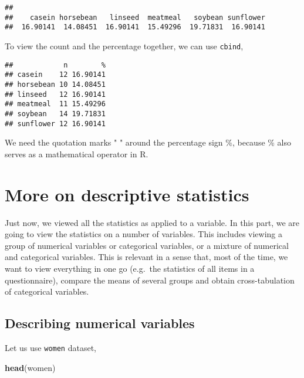 \documentclass[]{book}
\newenvironment{Shaded}{\begin{snugshade}}{\end{snugshade}}
\newcommand{\KeywordTok}[1]{\textcolor[rgb]{0.13,0.29,0.53}{\textbf{{#1}}}}
\newcommand{\DataTypeTok}[1]{\textcolor[rgb]{0.13,0.29,0.53}{{#1}}}
\newcommand{\DecValTok}[1]{\textcolor[rgb]{0.00,0.00,0.81}{{#1}}}
\newcommand{\StringTok}[1]{\textcolor[rgb]{0.31,0.60,0.02}{{#1}}}
\newcommand{\NormalTok}[1]{{#1}}
\theoremstyle{definition}
\theoremstyle{definition}
\theoremstyle{remark}
\begin{document}
\begin{verbatim}
## 
##    casein horsebean   linseed  meatmeal   soybean sunflower 
##  16.90141  14.08451  16.90141  15.49296  19.71831  16.90141
\end{verbatim}

To view the count and the percentage together, we can use
\texttt{cbind},

\begin{Shaded}
\end{Shaded}

\begin{verbatim}
##            n        %
## casein    12 16.90141
## horsebean 10 14.08451
## linseed   12 16.90141
## meatmeal  11 15.49296
## soybean   14 19.71831
## sunflower 12 16.90141
\end{verbatim}

We need the quotation marks " " around the percentage sign \%, because
\% also serves as a mathematical operator in R.

\section{More on descriptive
statistics}\label{more-on-descriptive-statistics}

Just now, we viewed all the statistics as applied to a variable. In this
part, we are going to view the statistics on a number of variables. This
includes viewing a group of numerical variables or categorical
variables, or a mixture of numerical and categorical variables. This is
relevant in a sense that, most of the time, we want to view everything
in one go (e.g.~the statistics of all items in a questionnaire), compare
the means of several groups and obtain cross-tabulation of categorical
variables.

\subsection{Describing numerical
variables}\label{describing-numerical-variables}

Let us use \texttt{women} dataset,

\begin{Shaded}
\begin{Highlighting}[]
\KeywordTok{head}\NormalTok{(women)}
\end{Highlighting}
\end{Shaded}
\end{document}
